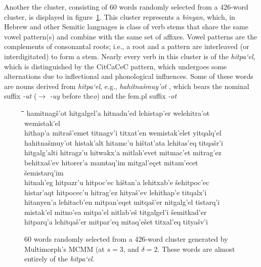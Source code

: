 Another the cluster, consisting of 60 words randomly selected from a 426-word cluster, is displayed in figure~\ref{fig:cl-hit}. This cluster represents a \emph{binyan}, which, in Hebrew and other Semitic languages is class of verb stems that share the same vowel pattern(s) and combine with the same set of affixes. Vowel patterns are the complements of consonantal roots; i.e., a root and a pattern are interleaved (or interdigitated) to form a stem. 
Nearly every verb in this cluster is of the \textit{hitpa`el}, which is distinguished by the CitCaCeC pattern, which undergoes some alternations due to inflectional and phonological influences. Some of these words are nouns derived from \textit{hitpa`el}, e.g., \textit{hahitna\v{s}muy\a'{o}t }, which bears the nominal suffix \textit{-ut} ($\to$ \textit{-uy} before the\textit{o}) and the fem.pl suffix \textit{-ot} 
\begin{figure}[ht]
\begin{tabbing}
\hspace*{14ex}\= \hspace*{14ex}\=\hspace*{14ex}\=\hspace*{14ex}\=\hspace*{14ex}\=\hspace*{14ex} \kill
hamitnag\v{s}\a'{o}t \> hitgalgel\a'{a} \> hitnadn\a'{e}d \> lehistap\a'{e}r \> welehitra\a'{o}t \> wemistak\a'{e}l\\
hithap\a'{a} \> mitra\v{s}\a'{e}met \> titnagv\a'{i} \> titxat\a'{e}n \> wemistak\a'{e}let \> yitqalq\a'{e}l\\
hahitna\v{s}muy\a'{o}t \> histak\a'{a}lt \> hitamc\a'{u} \> hi\v{s}tat\a'{a}ta \> lehitas\a'{e}q \> titqa\v{s}r\a'{i}\\
hitgalg\a'{a}lti \> hitragz\a'{u} \> hitwakx\a'{a} \> mitlah\a'{e}vet \> mitmac\a'{e}t \> mitrag\a'{e}z\\
behitxa\v{s}\a'{e}v \> hitorer\a'{a} \> mamtaq\a'{i}m \> mitgal\a'{e}çet \> mitam\a'{e}cet \> \v{s}emistarq\a'{i}m\\
hitnah\a'{e}g \> hitpazr\a'{u} \> hitpoc\a'{e}c \> hi\v{s}tan\a'{a} \> lehitxab\a'{e} \> \v{s}ehitpoc\a'{e}c\\
histar\a'{a}qt \> hitpocec\a'{u} \> hitrag\a'{e}z \> hitya\v{s}\a'{e}v \> lehithap\a'{e} \> titqalx\a'{i}\\
hitanyen\a'{a} \> lehitacb\a'{e}n \> mitpan\a'{e}qet \> mitqa\v{s}\a'{e}r \> nitgalg\a'{e}l \> tistarq\a'{i}\\
mistak\a'{e}l \> mitno\a'{e}a \> mitpa\a'{e}l \> nitlab\a'{e}\v{s} \> titgalgel\a'{i} \> \v{s}emitkad\a'{e}r\\
hitparq\a'{a} \> lehitqa\v{s}\a'{e}r \> mitpar\a'{e}q \> mitaq\a'{e}\v{s}et \> titxal\a'{e}q \> titya\v{s}v\a'{i}
\end{tabbing}
\caption{60 words randomly selected from a 426-word cluster generated by Multimorph's MCMM (at $s = 3$, and $\delta = 2$. These words are almost entirely of the \textit{hitpa`el}.}
\label{fig:cl-hit}
\end{figure}

